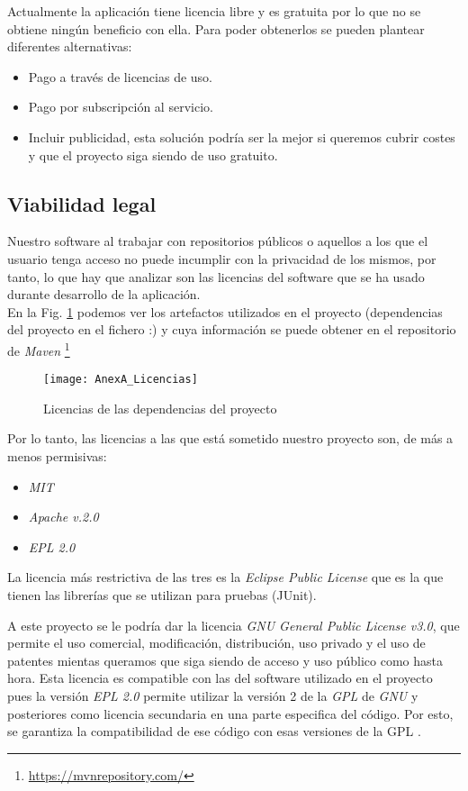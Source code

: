 Actualmente la aplicación tiene licencia libre y es gratuita por lo que no se obtiene ningún beneficio con ella. Para poder obtenerlos se pueden plantear diferentes alternativas:

\begin{itemize}
	\item Pago a través de licencias de uso.
	\item Pago por subscripción al servicio.
	\item Incluir publicidad, esta solución podría ser la mejor si queremos cubrir costes y que el proyecto siga siendo de uso gratuito.
\end{itemize}


\subsection{Viabilidad legal}
Nuestro software al trabajar con repositorios públicos o aquellos a los que el usuario tenga acceso no puede incumplir con la privacidad de los mismos, por tanto, lo que hay que analizar son las licencias del software que se ha usado durante desarrollo de la aplicación.\\
 En la Fig. \ref{fig:AnexA_Licencias} podemos ver los artefactos utilizados en el proyecto (dependencias del proyecto en el fichero :) y cuya información se puede obtener en el repositorio de \textit{Maven} \footnote{\url{https://mvnrepository.com/}} 

\begin{figure}[!h]
	\centering
	\texttt{[image: AnexA\_Licencias]}
	\caption{Licencias de las dependencias del proyecto}
	\label{fig:AnexA_Licencias}
\end{figure}
\FloatBarrier

Por lo tanto, las licencias a las que está sometido nuestro proyecto son, de más a menos permisivas:
\begin{itemize}
	\item \textit{MIT}
	\item \textit{Apache v.2.0}
	\item \textit{EPL 2.0}
\end{itemize}

La licencia más restrictiva de las tres es la \textit{Eclipse Public License} que es la que tienen las librerías que se utilizan para pruebas (JUnit).

A este proyecto se le podría dar la licencia \textit{GNU General Public License v3.0}, que permite el uso comercial, modificación, distribución, uso privado y el uso de patentes mientas queramos que siga siendo de acceso y uso público como hasta hora.
Esta licencia es compatible con las del software utilizado en el proyecto pues la versión \textit{EPL 2.0} permite utilizar la versión 2 de la \textit{GPL} de \textit{GNU} y posteriores como licencia secundaria en una parte especifica del código. Por esto, se garantiza la compatibilidad de ese código con esas versiones de la GPL \cite{santiago_lista_2019}.